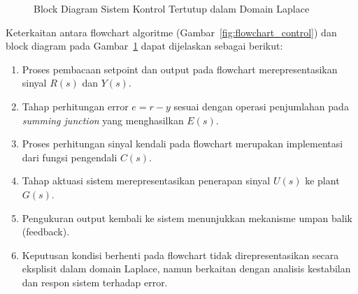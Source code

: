     \begin{figure}[!ht]
    \centering
    \caption{Block Diagram Sistem Kontrol Tertutup dalam Domain Laplace}
    \label{fig:block_diagram_control}
    \end{figure}
    
    \noindent Keterkaitan antara flowchart algoritme (Gambar~\ref{fig:flowchart_control}) dan block diagram pada Gambar~\ref{fig:block_diagram_control} dapat dijelaskan sebagai berikut:
    
    \begin{enumerate}
        \item Proses pembacaan setpoint dan output pada flowchart merepresentasikan sinyal $R(s)$ dan $Y(s)$.
        \item Tahap perhitungan error $e = r - y$ sesuai dengan operasi penjumlahan pada \textit{summing junction} yang menghasilkan $E(s)$.
        \item Proses perhitungan sinyal kendali pada flowchart merupakan implementasi dari fungsi pengendali $C(s)$.
        \item Tahap aktuasi sistem merepresentasikan penerapan sinyal $U(s)$ ke plant $G(s)$.
        \item Pengukuran output kembali ke sistem menunjukkan mekanisme umpan balik (feedback).
        \item Keputusan kondisi berhenti pada flowchart tidak direpresentasikan secara eksplisit dalam domain Laplace, namun berkaitan dengan analisis kestabilan dan respon sistem terhadap error.
    \end{enumerate}

